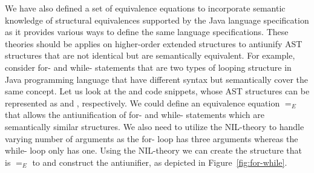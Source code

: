 We have also defined a set of equivalence equations to incorporate semantic knowledge of structural equivalences supported by the Java language specification as it provides various ways to define the same language specifications. These theories should be applies on higher-order extended structures to antiunify AST structures that are not identical but are semantically equivalent. For example, consider for- and while- statements that are two types of looping structure in Java programming language that have different syntax but semantically cover the same concept. Let us look at the  and  code snippets, whose AST structures can be represented as  and , respectively. We could define an equivalence equation $=_E$ that allows the antiunification of for- and while- statements which are semantically similar structures. We also need to utilize the NIL-theory to handle varying number of arguments as the for- loop has three arguments whereas the while- loop only has one. Using the NIL-theory we can create the structure  that is $=_E$ to  and construct the antiunifier,  as depicted in Figure~\ref{fig:for-while}.

